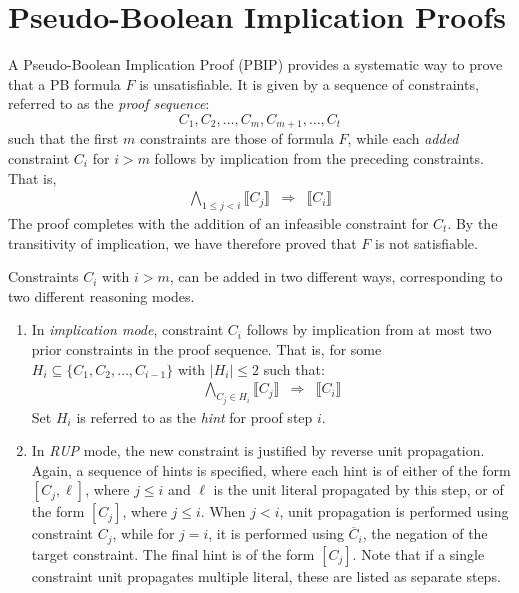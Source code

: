 \documentclass{easychair}
\renewcommand{\obar}[1]{\overline{#1}}
\newcommand{\lit}{\ell}
\newcommand{\imply}{\Rightarrow}
\newcommand{\func}[1]{\llbracket#1\rrbracket}
\begin{document}
\section{Pseudo-Boolean Implication Proofs}

A Pseudo-Boolean Implication Proof (PBIP) provides a systematic way to
prove that a PB formula $F$ is unsatisfiable.  It is given by a sequence of constraints, referred to as the {\em proof sequence}:
\begin{displaymath}
  C_1, C_2, \ldots, C_m, C_{m+1}, \ldots, C_t
\end{displaymath}  
such that the first $m$ constraints are those of formula $F$, while each {\em added} constraint $C_i$
for  $i > m$ follows by implication from the preceding constraints.
That is, 
\begin{eqnarray}
\bigwedge_{1 \leq j < i} \func{C_j} & \imply & \func{C_i} \label{eqn:proofsequence}
\end{eqnarray}
The proof completes with the addition of an infeasible constraint for $C_t$.
By the transitivity of implication, we have therefore proved that $F$ is not satisfiable.

Constraints $C_{i}$ with $i > m$, can be added in two different ways, corresponding to two different reasoning modes.
\begin{enumerate}
\item In {\em implication mode}, constraint $C_i$ follows by implication from at most two prior constraints in the  proof sequence.
  That is, for some $H_i \subseteq \{C_1, C_2,
  \ldots, C_{i-1}\}$ with $|H_i| \leq 2$ such that:
\begin{eqnarray}
\bigwedge_{C_j \in H_i} \func{C_j} & \imply & \func{C_i} \label{eqn:implicationmode}
\end{eqnarray}
Set $H_i$ is referred to as the {\em hint} for proof step $i$.
\item In \emph{RUP} mode, the new constraint is justified by reverse
  unit propagation.  Again, a sequence of hints is specified, where
  each hint is of either of the form $[C_j, \lit]$,
  where $j \leq i$ and $\lit$ is the unit
  literal propagated by this step, or of the form $[C_j]$, where $j \leq i$.
  When $j < i$, unit
  propagation is performed using constraint $C_j$, while for $j = i$,
  it is performed using $\obar{C}_i$, the negation of the target
  constraint.
  The final hint is of the form $[C_j]$.
  Note that if a single constraint unit propagates multiple literal, these are listed as separate steps.

\end{enumerate}
\end{document}
